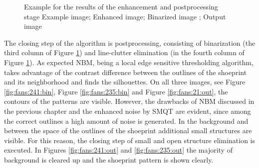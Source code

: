 \documentclass[draft,final]{vutinfth} %
\begin{document}
{\begin{figure}[H]

\caption{Example for the results of the enhancement and postprocessing stage
				 Example image;  Enhanced image;  Binarized image ;  Output image}
\label{fig:fans:enhance}

\end{figure}
}
\par
The closing step of the algorithm is postprocessing, consisting of binarization (the third column of Figure \ref{fig:fans:enhance}) and line-clutter elimination (in the fourth column of Figure \ref{fig:fans:enhance}).
As expected NBM, being a local edge sensitive thresholding algorithm, takes advantage of the contrast difference between the outlines of the shoeprint  and its neighborhood and finds the silhouettes. 
On all three images, see Figure \ref{fig:fans:241:bin}, Figure \ref{fig:fans:235:bin} and Figure \ref{fig:fans:21:out}, the contours of the patterns are visible.
However, the drawbacks of NBM discussed in the previous chapter and the enhanced noise by SMQT are evident, since among the correct outlines a high amount of noise is generated.
In the background and between the space of the outlines of the shoeprint additional small structures are visible.
For this reason, the closing step of small and open structure elimination is executed.
In Figures \ref{fig:fans:241:out} and \ref{fig:fans:235:out} the majority of background is cleared up and the shoeprint pattern is shown clearly.
\end{document}
